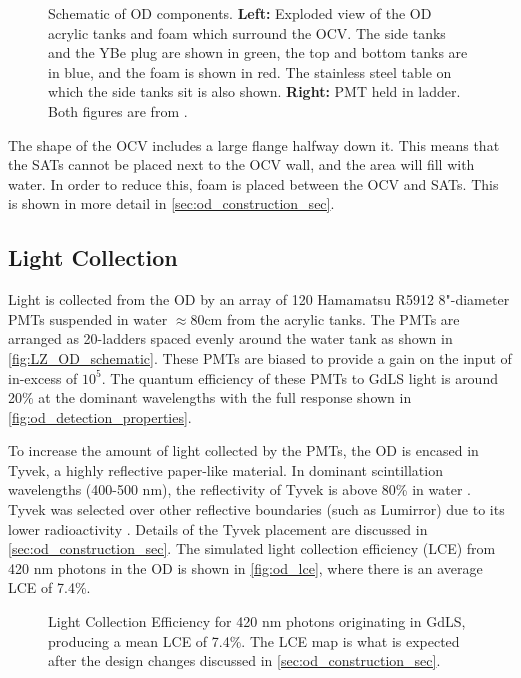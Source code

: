 \begin{figure}[]
\begin{subfigure}{.5\textwidth}
  \end{subfigure}
\caption{Schematic of OD components. \textbf{Left:} Exploded view of the OD acrylic tanks and foam which surround the OCV. The side tanks and the YBe plug are shown in green, the top and bottom tanks are in blue, and the foam is shown in red. The stainless steel table on which the side tanks sit is also shown. \textbf{Right:} PMT held in ladder.
         Both figures are from \cite{LZ_TechnicalDesignReview_ref}.}
\label{fig:LZ_OD_schematic}
\end{figure}

\par
The shape of the OCV includes a large flange halfway down it. 
This means that the SATs cannot be placed next to the OCV wall, and the area will fill with water.
In order to reduce this, foam is placed between the OCV and SATs.
This is shown in more detail in \autoref{sec:od_construction_sec}.

\subsection{Light Collection}
\par
Light is collected from the OD by an array of 120 Hamamatsu R5912 8"-diameter PMTs suspended in water $\approx$80cm from the acrylic tanks.
The PMTs are arranged as 20-ladders spaced evenly around the water tank as shown in \autoref{fig:LZ_OD_schematic}.
These PMTs are biased to provide a gain on the input of in-excess of $10^{5}$.
The quantum efficiency of these PMTs to GdLS light is around 20\% at the dominant wavelengths with the full response shown in \autoref{fig:od_detection_properties}.

\par
To increase the amount of light collected by the PMTs, the OD is encased in Tyvek, a highly reflective paper-like material.
In dominant scintillation wavelengths (400-500 nm), the reflectivity of Tyvek is above 80\% in water \cite{tyvek_thesis_ref,tyvek_reflectivity_ref}. 
Tyvek was selected over other reflective boundaries (such as Lumirror) due to its lower radioactivity \cite{LZ_assay_ref}.
Details of the Tyvek placement are discussed in \autoref{sec:od_construction_sec}.
The simulated light collection efficiency (LCE) from 420 nm photons in the OD is shown in \autoref{fig:od_lce}, where there is an average LCE of 7.4\%.

\begin{figure}
\centering
\resizebox{\textwidth}{!}{

}
\caption[Light Collection Efficiency for 420 nm photons originating in GdLS]{Light Collection Efficiency for 420 nm photons originating in GdLS, producing a mean LCE of 7.4\%.
The LCE map is what is expected after the design changes discussed in \autoref{sec:od_construction_sec}.}
\label{fig:od_lce}
\end{figure}

